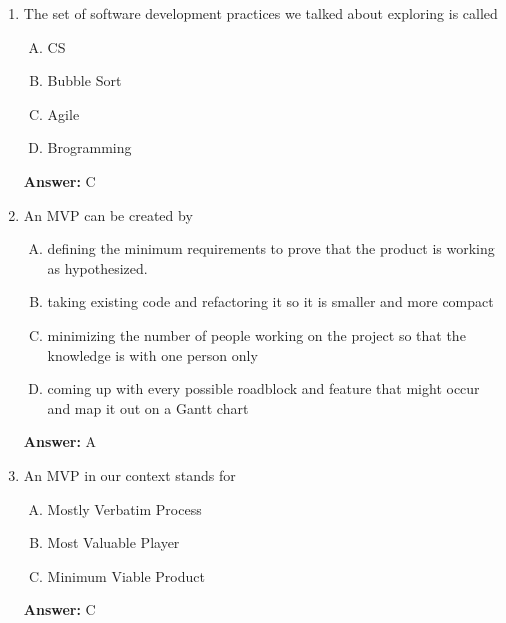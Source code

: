 \documentclass[12pt]{article}
\begin{document}
\begin{enumerate}[1.]
    \item

    The set of software development practices we talked about exploring is called

    \bigskip

    \begin{enumerate}[A.]
        \item CS
        \item Bubble Sort
        \item Agile
        \item Brogramming
    \end{enumerate}

    \bigskip

    \textbf{Answer:} C

    \item

    An MVP can be created by

    \bigskip

    \begin{enumerate}[A.]
        \item defining the minimum requirements to prove that the product is working as hypothesized.
        \item taking existing code and refactoring it so it is smaller and more compact
        \item minimizing the number of people working on the project so that the knowledge is with one person only
        \item coming up with every possible roadblock and feature that might occur and map it out on a Gantt chart
    \end{enumerate}

    \bigskip

    \textbf{Answer:} A

    \item

    An MVP in our context stands for

    \bigskip

    \begin{enumerate}[A.]
        \item Mostly Verbatim Process
        \item Most Valuable Player
        \item Minimum Viable Product
    \end{enumerate}

    \bigskip

    \textbf{Answer:} C

\end{enumerate}
\end{document}
